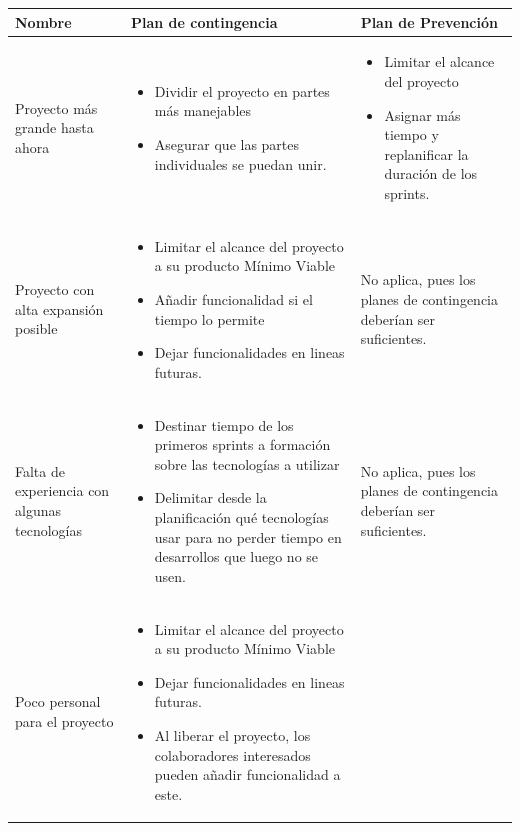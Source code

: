 \begin{center}
	\begin{xltabular}{\textwidth}{|X|X|X|}
		{}\textbf{Nombre} & {}\textbf{Plan de contingencia} & {}\textbf{Plan de Prevención} \\
		\hline
		Proyecto más grande hasta ahora & \begin{itemize}
		\item Dividir el proyecto en partes más manejables
		\item Asegurar que las partes individuales se puedan unir.
		\end{itemize} & \begin{itemize}
		\item Limitar el alcance del proyecto
		\item Asignar más tiempo y replanificar la duración de los sprints.
	\end{itemize}\\
		\hline
		Proyecto con alta expansión posible & \begin{itemize}
			\item Limitar el alcance del proyecto a su producto Mínimo Viable
			\item Añadir funcionalidad si el tiempo lo permite
			\item Dejar funcionalidades en lineas futuras.
		\end{itemize} & No aplica, pues los planes de contingencia deberían ser suficientes. \\
		\hline
		Falta de experiencia con algunas tecnologías & \begin{itemize}
			\item Destinar tiempo de los primeros sprints a formación sobre las tecnologías a utilizar
			\item Delimitar desde la planificación qué tecnologías usar para no perder tiempo en desarrollos que luego no se usen.
		\end{itemize} & No aplica, pues los planes de contingencia deberían ser suficientes. \\
		\hline
		Poco personal para el proyecto & \begin{itemize}
			\item Limitar el alcance del proyecto a su producto Mínimo Viable
			\item Dejar funcionalidades en lineas futuras.
			\item Al liberar el proyecto, los colaboradores interesados pueden añadir funcionalidad a este.

\end{itemize}
\end{xltabular}
\end{center}
